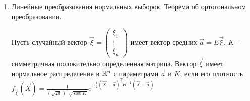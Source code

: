 \documentclass[12pt]{article}
\begin{document}
\begin{enumerate}
\begin{enumerate}
        \item $\frac{\chi_k^2}{k} \overset{p}{\underset{k \to \infty}{\longrightarrow}} 1$ (по Закону Больших Чисел)
    \end{enumerate}

    \Def Пусть $X_0, X_1, \dots, X_k$ - независимые стандартные нормальные величины. 
    Распределением Стьюдента $T_k$ с $k$ степенями свободы называется распределение случайной величины 
    $t_k = \frac{X_0}{\sqrt{\frac{1}{k} (X_1^2 + \dots + X_k^2)}} = \frac{X_0}{\sqrt{\frac{\chi_k^2}{k}}}$

    \underline{Свойства}

    \begin{enumerate}
        \item $Et_k = 0$ - в силу симметрии

        \item $t_k \rightrightarrows N(0, 1)$ (на практике при $k \geq 100$ распределение Стьюдента можно считать стандартным нормальным)
    \end{enumerate}

    \Def Распределением Фишера-Снедекера $F_{n,m}$ (другое название - F-распределение) со степенями свободы $n$ и $m$ называется распределение случайной величины 
    $f_{n,m} = \frac{\frac{\chi^2_n}{n}}{\frac{\chi^2_m}{m}}$, где $\chi_n^2$ и $\chi_m^2$ - независимые случайные величины с распределением \enquote{хи-квадрат}

    \underline{Свойства}

    \begin{enumerate}
        \item $E f_{n,m} = \frac{m}{m - 2}$ при $m > 2$

        \item $f_{n,m} \overset{p}{\underset{n, m \to \infty}{\longrightarrow}} 1$
    \end{enumerate}

    \item Линейные преобразования нормальных выборок. Теорема об ортогональном преобразовании.

    \Def Пусть случайный вектор $\vec \xi = \begin{pmatrix}\xi_1 \\ \vdots \\ \xi_n\end{pmatrix}$ имеет вектор средних 
    $\vec a = E \vec \xi$, $K$ - симметричная положительно определенная матрица. Вектор $\vec \xi$ 
    имеет нормальное распределение в $\mathbb{R}^n$ с параметрами $\vec a$ и $K$, если его плотность 
    $f_{\vec \xi} (\vec X) = \frac{1}{\left(\sqrt{2\pi}\right)^n \sqrt{\det K}} e^{-\frac{1}{2} (\vec X - \vec a)^T K^{-1} (\vec X - \vec a)}$



\end{enumerate}
\end{document}
